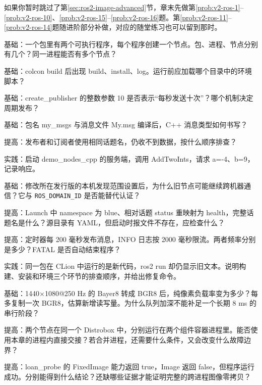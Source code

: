 \begin{note}
如果你暂时跳过了第\ref{sec:ros2-image-advanced}节，章末先做第\ref{prob:v2-ros-1}--\ref{prob:v2-ros-10}、\ref{prob:v2-ros-15}--\ref{prob:v2-ros-16}题。第\ref{prob:v2-ros-11}--\ref{prob:v2-ros-14}题随进阶部分补做，对应的随堂练习也可以留到那时。
\end{note}
\begin{problemset}
\renewcommand{\theenumi}{\arabic{enumi}}
\item \label{prob:v2-ros-1}基础：一个包里有两个可执行程序，每个程序创建一个节点。包、进程、节点分别有几个？同一进程能否有多个节点？
\item \label{prob:v2-ros-2}基础：colcon build 后出现 build、install、log。运行前应加载哪个目录中的环境脚本？
\item \label{prob:v2-ros-3}基础：create\_publisher 的整数参数 10 是否表示“每秒发送十次”？哪个机制决定周期发布？
\item \label{prob:v2-ros-4}基础：包名 my\_msgs 与消息文件 My.msg 编译后，C++ 消息类型如何书写？
\item \label{prob:v2-ros-5}提高：发布者和订阅者使用相同话题名，仍收不到数据，按什么顺序排查？
\item \label{prob:v2-ros-6}实践：启动 demo\_nodes\_cpp 的服务端，调用 AddTwoInts，请求 a=-4、b=9，记录响应。
\item \label{prob:v2-ros-7}基础：修改所在发行版的本机发现范围设置后，为什么旧节点可能继续跨机器通信？它与 \nolinkurl{ROS_DOMAIN_ID} 是否能替代认证？
\item \label{prob:v2-ros-8}提高：Launch 中 namespace 为 blue、相对话题 status 重映射为 health，完整话题名是什么？源目录有 YAML，但启动时报文件不存在，应检查什么？
\item \label{prob:v2-ros-9}提高：定时器每 200 毫秒发布消息，INFO 日志按 2000 毫秒限流。两者频率分别是多少？FATAL 是否自动结束程序？
\item \label{prob:v2-ros-10}实践：同一包在 CLion 中运行的是新代码，ros2 run 却仍显示旧文本。说明构建、安装和环境三个环节的排查顺序，并给出修复命令。
\item \label{prob:v2-ros-11}基础：1440×1080@250 Hz 的 Bayer8 转成 BGR8 后，纯像素负载率变为多少？每多复制一次 BGR8，估算新增读写量。为什么队列加深不能补足一个长期 8 ms 的串行阶段？
\item \label{prob:v2-ros-12}提高：两个节点在同一个 Distrobox 中，分别运行在两个组件容器进程里。能否使用本章的进程内直接交接？若合并进程，还需要什么条件，又会改变什么故障边界？
\item \label{prob:v2-ros-13}提高：loan\_probe 的 FixedImage 能力返回 true，Image 返回 false，但程序运行成功。分别能得到什么结论？还缺哪些证据才能证明完整的跨进程图像零拷贝？

\end{problemset}
